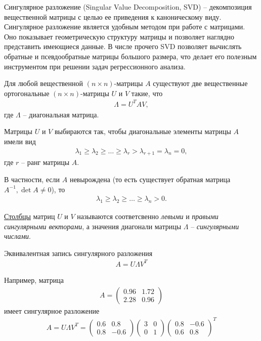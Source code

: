 \documentclass[%
	11pt,
	a4paper,
	utf8,
		]{article}
\begin{document}
Сингулярное разложение (Singular Value Decomposition, SVD) -- декомпозиция вещественной матрицы с целью ее приведения к каноническому виду. Сингулярное разложение является удобным методом при работе с матрицами. Оно показывает геометрическую структуру матрицы и позволяет наглядно представить имеющиеся данные. В числе прочего SVD позволяет вычислять обратные и псевдообратные матрицы большого размера, что делает его полезным инструментом при решении задач регрессионного анализа.


Для любой вещественной $ (n \times n) $-матрицы $ A $ существуют две вещественные ортогональные $ (n \times n) $-матрицы $ U $ и $ V $ такие, что
\begin{align*}
	\Lambda = U^{T} A V,
\end{align*}
где $ \Lambda $ -- диагональная матрица.

Матрицы $ U $ и $ V $ выбираются так, чтобы диагональные элементы матрицы $ A $ имели вид
\begin{align*}
	\lambda_1 \geqslant \lambda_2 \geqslant \ldots \geqslant \lambda_r > \lambda_{r + 1} = \lambda_n = 0,
\end{align*}
где $ r $ -- ранг матрицы $ A $.

В частности, если $ A $ невырождена (то есть существует обратная матрица $ A^{-1}, \det A \neq 0 $), то
\begin{align*}
	\lambda_1 \geqslant \lambda_2 \geqslant \ldots \geqslant \lambda_n > 0.
\end{align*}

\underline{Столбцы} матриц $ U $ и $ V $ называются соответсвенно \emph{левыми} и \emph{правыми сингулярными векторами}, а значения диагонали матрицы $ \Lambda $ -- \emph{сингулярными числами}.

Эквивалентная запись сингулярного разложения
\begin{align*}
	A = U \Lambda V^{T}
\end{align*}

Например, матрица
\begin{align*}
	A = \begin{pmatrix}
		0.96 & 1.72 \\
		2.28 & 0.96
	\end{pmatrix}
\end{align*}
имеет сингулярное разложение
\begin{align*}
	A = U \Lambda V^{T} =
	\begin{pmatrix}
		0.6 & 0.8\\
		0.8 & -0.6
	\end{pmatrix}
    \begin{pmatrix}
    	3 & 0\\
    	0 & 1
    \end{pmatrix}
    \begin{pmatrix}
    	0.8 & -0.6 \\
    	0.6 & 0.8
    \end{pmatrix}^T
\end{align*}
\end{document}
